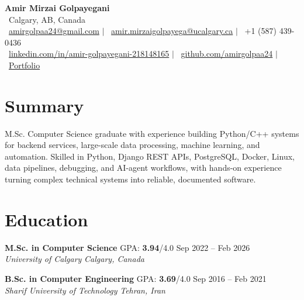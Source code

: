 \documentclass[a4paper,10pt]{article}
\newcommand{\resumeEducationSubheading}[5]{
    \textbf{#1} \hfill #2 \hfill #3 \\
    \textit{#4} \hfill \textit{#5}
}
\begin{document}

\begin{center}
    {\LARGE \textbf{Amir Mirzai Golpayegani}} \\[0.25em]
    \faMapMarker*~Calgary, AB, Canada \\[0.25em]
    \faEnvelope~\href{mailto:amirgolpaa24@gmail.com}{amirgolpaa24@gmail.com}
    $|$
    \faEnvelope~\href{mailto:amir.mirzaigolpayega@ucalgary.ca}{amir.mirzaigolpayega@ucalgary.ca}
    $|$
    \faPhone*~+1 (587) 439-0436 \\[0.25em]
    \faLinkedin~\href{https://linkedin.com/in/amir-golpayegani-218148165}{linkedin.com/in/amir-golpayegani-218148165}
    $|$
    \faGithub~\href{https://github.com/amirgolpaa24}{github.com/amirgolpaa24}
    $|$
    \faGlobe~\href{https://amir-portfolio-navy.vercel.app/}{Portfolio}
\end{center}


\section*{Summary}

M.Sc. Computer Science graduate with experience building Python/C++ systems for backend services, large-scale data processing, machine learning, and automation. Skilled in Python, Django REST APIs, PostgreSQL, Docker, Linux, data pipelines, debugging, and AI-agent workflows, with hands-on experience turning complex technical systems into reliable, documented software.


\section*{Education}

\resumeEducationSubheading
{M.Sc. in Computer Science}
{GPA: \textbf{3.94}/4.0}
{Sep 2022 -- Feb 2026}
{University of Calgary}
{Calgary, Canada}

\vspace{0.35em}

\resumeEducationSubheading
{B.Sc. in Computer Engineering}
{GPA: \textbf{3.69}/4.0}
{Sep 2016 -- Feb 2021}
{Sharif University of Technology}
{Tehran, Iran}

\end{document}

